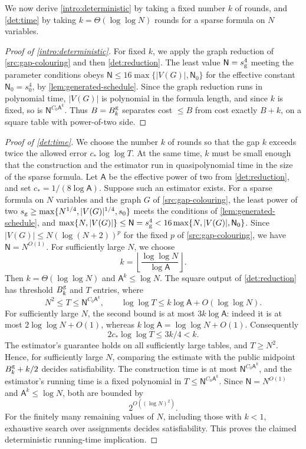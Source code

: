 \documentclass[11pt,letterpaper]{article} \usepackage[utf8]{inputenc}
\theoremstyle{plain} \newtheorem{theorem}{Theorem}[section]
\theoremstyle{definition} \newaliascnt{definition}{theorem}
\newcommand{\floor}[1]{\left\lfloor#1\right\rfloor}
\begin{document}
We now derive \cref{intro:deterministic} by taking a fixed number $k$ of rounds,
and \cref{det:time} by taking $k=\Theta(\log\log N)$ rounds for a sparse formula on
$N$ variables.

\begin{proof}[Proof of \cref{intro:deterministic}]
\label{proof:intro:deterministic}
For fixed $k$, we apply the graph reduction of \cref{src:gap-colouring} and then
\cref{det:reduction}. The least value $\mathsf N=s_{\rm g}^4$ meeting the parameter conditions obeys
$\mathsf N\le16\max\{|V(G)|,\mathsf N_0\}$ for the effective constant
$\mathsf N_0=s_0^4$, by \cref{lem:generated-schedule}. Since the graph reduction runs in
polynomial time, $|V(G)|$ is polynomial in the formula length, and since $k$ is fixed, so is
$\mathsf N^{C_0\mathsf A^k}$.
Thus $B=B_k^{\rm g}$ separates cost $\le B$ from
cost exactly $B+k$, on a square table with power-of-two side.
\end{proof}

\begin{proof}[Proof of \cref{det:time}]
\label{proof:det:time}
We choose the number $k$ of rounds so that the gap $k$ exceeds twice the
allowed error $c_*\log\log T$. At the same time, $k$ must be small enough that the
construction and the estimator run in quasipolynomial time in the size of the sparse formula.
Let $\mathsf A$ be the effective power of two from \cref{det:reduction}, and
set $c_*=1/(8\log\mathsf A)$. Suppose such an estimator exists.
For a sparse formula on $N$ variables and the graph $G$ of \cref{src:gap-colouring},
the least power of two $s_{\rm g}\ge\max\{N^{1/4},|V(G)|^{1/4},s_0\}$ meets the
conditions of \cref{lem:generated-schedule}, and
$\max\{N,|V(G)|\}\le\mathsf N=s_{\rm g}^4<16\max\{N,|V(G)|,\mathsf N_0\}$.
Since $|V(G)|\le N(\log(N+2))^p$ for the fixed $p$ of
\cref{src:gap-colouring}, we have $\mathsf N=N^{O(1)}$.
For sufficiently large $N$, we choose
\[
k=\floor{\frac{\log\log N}{\log\mathsf A}}.
\]
Then $k=\Theta(\log\log N)$ and $\mathsf A^k\le\log N$. The square output of
\cref{det:reduction} has threshold $B_k^{\rm g}$ and $T$ entries, where
\[
N^2\le T\le\mathsf N^{C_0\mathsf A^k},\qquad
\log\log T\le k\log\mathsf A+O(\log\log N).
\]
For sufficiently large $N$, the second bound is at most $3k\log\mathsf A$:
indeed it is at most $2\log\log N+O(1)$, whereas
$k\log\mathsf A=\log\log N+O(1)$.
Consequently
\[
2c_*\log\log T\le 3k/4<k.
\]
The estimator's guarantee holds on all sufficiently large tables, and $T\ge N^2$.
Hence, for sufficiently large $N$, comparing the estimate with the public midpoint
$B_k^{\rm g}+k/2$ decides satisfiability.
The construction time is at most $\mathsf N^{C_0\mathsf A^k}$, and the estimator's
running time is a fixed polynomial in $T\le\mathsf N^{C_0\mathsf A^k}$. Since
$\mathsf N=N^{O(1)}$ and $\mathsf A^k\le\log N$, both are bounded by
\[
2^{O((\log N)^2)}.
\]
For the finitely many remaining values of $N$, including those with $k<1$,
exhaustive search over assignments decides satisfiability.
This proves the claimed deterministic running-time implication.
\end{proof}
\end{document}
